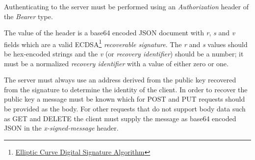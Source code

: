 \documentclass[a4paper,titlepage,oneside]{article}
\renewcommand{\paragraph}{\small}
\begin{document}
\paragraph{Authenticating to the server must be performed using an \emph{Authorization} header of the \emph{Bearer} type.}

\paragraph{The value of the header is a base64 encoded JSON document with \emph{r}, \emph{s} and \emph{v} fields which are a valid ECDSA\footnote{\href{https://en.wikipedia.org/wiki/Elliptic_Curve_Digital_Signature_Algorithm}{Elliptic Curve Digital Signature Algorithm}} \emph{recoverable signature}. The \emph{r} and \emph{s} values should be hex-encoded strings and the \emph{v} (or \emph{recovery identifier}) should be a number; it must be a normalized \emph{recovery identifier} with a value of either zero or one.}

\paragraph{The server must always use an address derived from the public key recovered from the signature to determine the identity of the client. In order to recover the public key a message must be known which for POST and PUT requests should be provided as the body. For other requests that do not support body data such as GET and DELETE the client must supply the message as base64 encoded JSON in the \emph{x-signed-message} header.}
\end{document}
